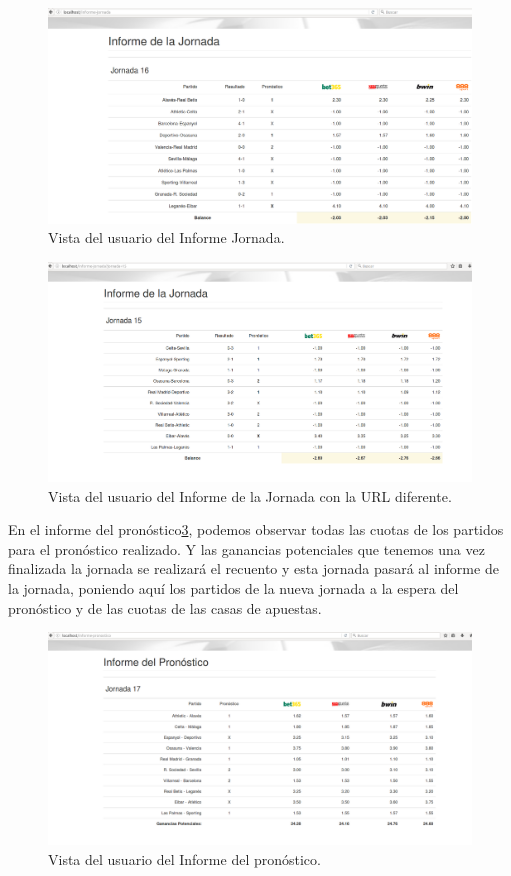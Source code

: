 \begin{figure}
\centering
\includegraphics[width=.9\textwidth]{img/drupal_inf_jornada_usuario}
\caption{Vista del usuario del Informe Jornada.}
\label{fig:InfJorDruUser}
\end{figure}
\begin{figure}
\centering
\includegraphics[width=.9\textwidth]{img/drupal_inf_jornada_usuario2}
\caption{Vista del usuario del Informe de la Jornada con la URL diferente.}
\label{fig:InfJor2DruUser}
\end{figure}

En el informe del pronóstico\ref{fig:InfProDruUser}, podemos observar todas las cuotas de los partidos para el pronóstico realizado. Y las ganancias potenciales que tenemos una vez finalizada la jornada se realizará el recuento y esta jornada pasará al informe de la jornada, poniendo aquí los partidos de la nueva jornada a la espera del pronóstico y de las cuotas de las casas de apuestas.

\begin{figure}
\centering
\includegraphics[width=.9\textwidth]{img/drupal_inf_pronostico_usuario}
\caption{Vista del usuario del Informe del pronóstico.}
\label{fig:InfProDruUser}
\end{figure}